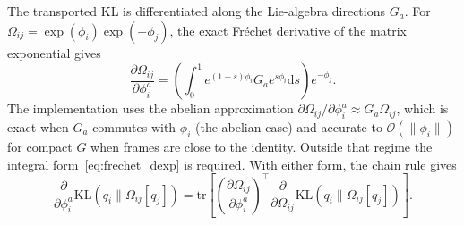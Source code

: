 \documentclass[11pt]{article}
\begin{document}
The transported KL is differentiated along the Lie-algebra directions $G_a$. For $\Omega_{ij} = \exp(\phi_i)\exp(-\phi_j)$, the exact Fr\'echet derivative of the matrix exponential gives
\begin{equation}
\frac{\partial \Omega_{ij}}{\partial \phi_i^a} = \left(\int_0^1 e^{(1-s)\phi_i} G_a e^{s\phi_i} \mathrm{d}s\right) e^{-\phi_j}.
\label{eq:frechet_dexp}
\end{equation}
The implementation uses the abelian approximation $\partial \Omega_{ij}/\partial \phi_i^a \approx G_a \Omega_{ij}$, which is exact when $G_a$ commutes with $\phi_i$ (the abelian case) and accurate to $\mathcal{O}(\|\phi_i\|)$ for compact $G$ when frames are close to the identity. Outside that regime the integral form~\eqref{eq:frechet_dexp} is required. With either form, the chain rule gives
\begin{equation}
\frac{\partial}{\partial \phi_i^a}\mathrm{KL}(q_i \| \Omega_{ij}[q_j]) = \mathrm{tr}\left[\left(\frac{\partial \Omega_{ij}}{\partial \phi_i^a}\right)^\top \frac{\partial}{\partial \Omega_{ij}}\mathrm{KL}(q_i \| \Omega_{ij}[q_j])\right].
\end{equation}
\end{document}
